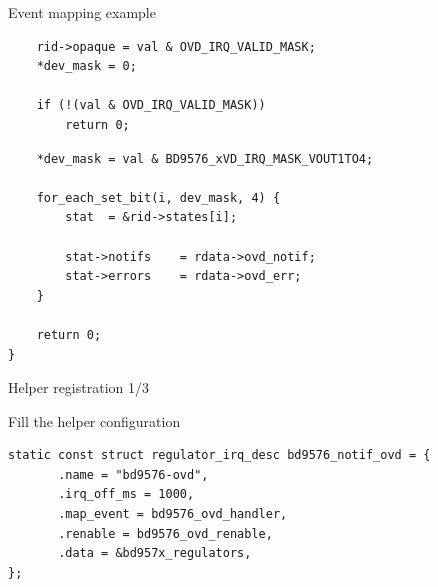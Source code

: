 \documentclass[10pt]{beamer}
\begin{document}
\begin{frame}[fragile]{Event mapping example}
\pause
\begin{lstlisting}
	rid->opaque = val & OVD_IRQ_VALID_MASK;
	*dev_mask = 0;

	if (!(val & OVD_IRQ_VALID_MASK))
		return 0;
\end{lstlisting}
\pause
\begin{lstlisting}
	*dev_mask = val & BD9576_xVD_IRQ_MASK_VOUT1TO4;

	for_each_set_bit(i, dev_mask, 4) {
		stat  = &rid->states[i];

		stat->notifs	= rdata->ovd_notif;
		stat->errors	= rdata->ovd_err;
	}

	return 0;
}

\end{lstlisting}
\end{frame}



\begin{frame}[fragile, t]{Helper registration 1/3}\vspace{4pt}

\lstset{language=C}

\large Fill the helper configuration
\vfill

\scriptsize
\begin{lstlisting}
static const struct regulator_irq_desc bd9576_notif_ovd = {              
       .name = "bd9576-ovd",                                            
       .irq_off_ms = 1000,                                              
       .map_event = bd9576_ovd_handler,                                 
       .renable = bd9576_ovd_renable,                                   
       .data = &bd957x_regulators,                                      
}; 
\end{lstlisting}
\end{frame}
\end{document}
